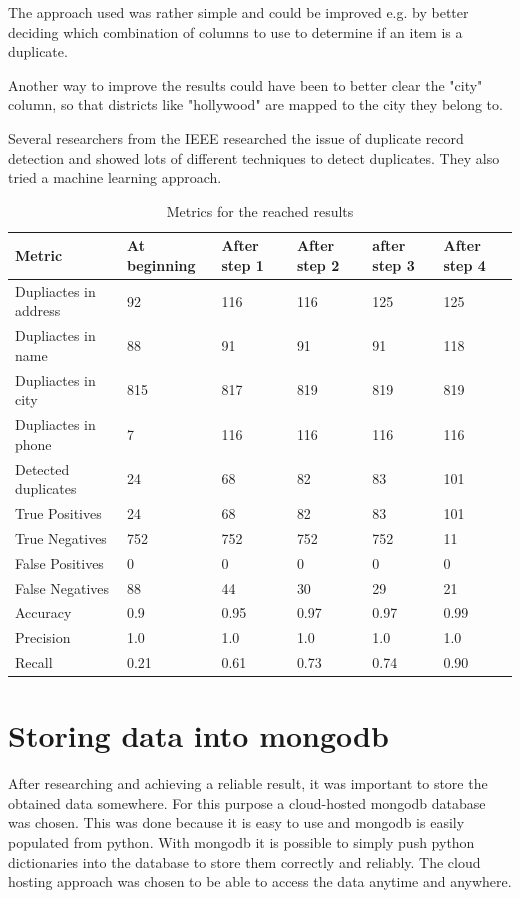\documentclass[conference]{IEEEtran}
\begin{document}
The approach used was rather simple and could be improved e.g. by better deciding which combination of columns to use to determine if an item is a duplicate. 

Another way to improve the results could have been to better clear the "city" column, so that districts like "hollywood" are mapped to the city they belong to. 

Several researchers from the IEEE researched the issue of duplicate record detection and showed lots of different techniques to detect duplicates. They also tried a machine learning approach\cite{bib:foreign_research}.   
\begin{table}[h]
	\begin{center}
		\caption{Metrics for the reached results}
		\label{tab:results} 
		\begin{tabular}{|p{1.5cm}||p{0.8cm}|p{0.8cm}|p{0.8cm}|p{0.8cm}|p{0.8cm}|}
			\hline
			Metric & At beginning & After step 1 & After step 2 & after step 3 & After step 4 \\ 
			\hline\hline
			Dupliactes in address &92&116&116&125&125\\
			\hline
			Dupliactes in name &88&91&91&91&118\\
			\hline
			Dupliactes in city &815&817&819&819&819\\
			\hline
			Dupliactes in phone &7 & 116&116&116&116\\
			\hline
			Detected duplicates &24&68&82&83&101\\
			\hline
			True Positives &24&68&82&83&101  \\ 
			\hline
			True Negatives &752&752&752&752&11  \\  
			\hline
			False Positives &0&0&0&0&0\\  
			\hline
			False Negatives &88 &44&30&29&21\\  
			\hline
			Accuracy &0.9&0.95&0.97&0.97&0.99\\  
			\hline
			Precision &1.0 & 1.0&1.0&1.0&1.0\\  
			\hline
			Recall &0.21&0.61&0.73&0.74&0.90\\
			\hline
		\end{tabular}
	\end{center}
\end{table}
\section{Storing data into mongodb}
After researching and achieving a reliable result, it was important to store the obtained  data somewhere. For this purpose a cloud-hosted mongodb database was chosen. This was done because it is easy to use and mongodb is easily populated from python. With mongodb it is possible to simply push python dictionaries into the database to store them correctly and reliably. The cloud hosting approach was chosen to be able to access the data anytime and anywhere. 
\end{document}

